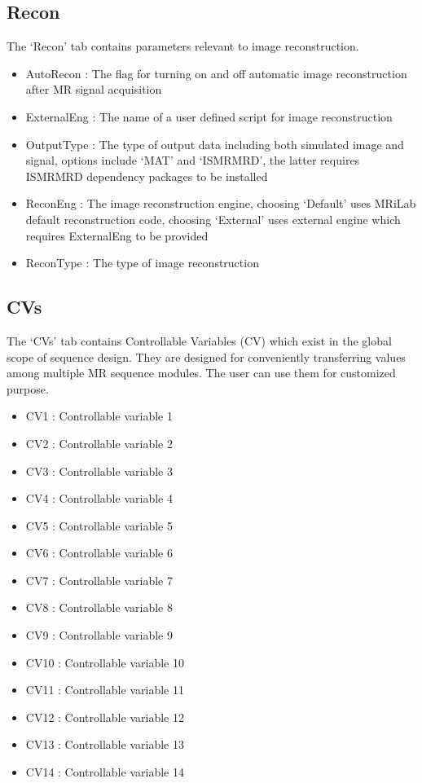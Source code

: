 \documentclass{book}%
\begin{document}
\subsection{Recon}
The `Recon' tab contains parameters relevant to image reconstruction.
	\begin{itemize}
		\item AutoRecon : The flag for turning on and off automatic image reconstruction after MR signal acquisition
		\item ExternalEng : The name of a user defined script for image reconstruction
		\item OutputType : The type of output data including both simulated image and signal, options include `MAT' and `ISMRMRD', the latter requires ISMRMRD dependency packages to be installed
	  \item ReconEng : The image reconstruction engine, choosing `Default' uses MRiLab default reconstruction code, choosing `External' uses external engine which requires ExternalEng to be provided
		\item ReconType :  The type of image reconstruction
	\end{itemize}

\subsection{CVs}
The `CVs' tab contains Controllable Variables (CV) which exist in the global scope of sequence design. They are designed for conveniently transferring values among multiple MR sequence modules. The user can use them for customized purpose.
	\begin{itemize}
		\item CV1 : Controllable variable 1
		\item CV2 : Controllable variable 2
		\item CV3 : Controllable variable 3
		\item CV4 : Controllable variable 4
		\item CV5 : Controllable variable 5
		\item CV6 : Controllable variable 6
		\item CV7 : Controllable variable 7
		\item CV8 : Controllable variable 8
		\item CV9 : Controllable variable 9
		\item CV10 : Controllable variable 10
		\item CV11 : Controllable variable 11
		\item CV12 : Controllable variable 12
		\item CV13 : Controllable variable 13
		\item CV14 : Controllable variable 14
	\end{itemize}
\end{document}
